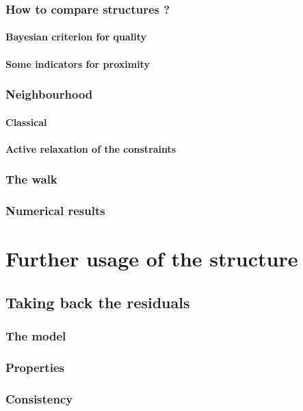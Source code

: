 \documentclass[11pt,a4paper]{report}
\begin{document}
	\section{How to compare structures ?}
		\subsection{Bayesian criterion for quality}
		\subsection{Some indicators for proximity}
	\section{Neighbourhood}
		\subsection{Classical}
		\subsection{Active relaxation of the constraints}
	\section{The walk}
	\section{Numerical results}
\part{Further usage of the structure}	
\chapter{Taking back the residuals}
	\section{The model}
	\section{Properties}
	\section{Consistency}
\end{document}
